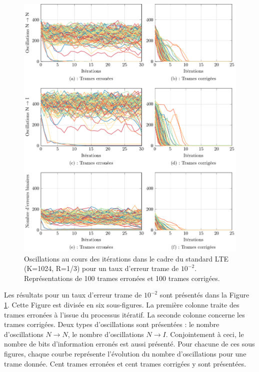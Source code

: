 \begin{figure}[!ht]
	\begin{center}
	\includegraphics[width=.9\textwidth]{main/ch2_fig/tikz/it_lte10-2.pdf}
	\caption{Oscillations au cours des itérations dans le cadre du standard LTE (K=1024, R=1/3) pour un taux d'erreur 
	trame de $10^{-2}$. Représentations de 100 trames erronées et 100 trames corrigées. \label{ch2:fig:it_lte_1}}
	\end{center}
\end{figure}

Les résultats pour un taux d'erreur trame de $10^{-2}$ sont présentés dans la  Figure \ref{ch2:fig:it_lte_1}. Cette 
Figure est divisée en six sous-figures. La première colonne traite des trames erronées à l'issue du processus 
itératif. La seconde colonne concerne les trames corrigées. Deux types d'oscillations sont présentées : le nombre d'oscillations 
$N\rightarrow N$, le nombre d'oscillations $N\rightarrow I$. Conjointement à ceci, le nombre de bits d'information erronés est aussi 
présenté. Pour chacune de ces sous figures, chaque courbe représente l'évolution du nombre d'oscillations
pour une trame donnée. Cent trames erronées et cent trames corrigées y sont présentées.

